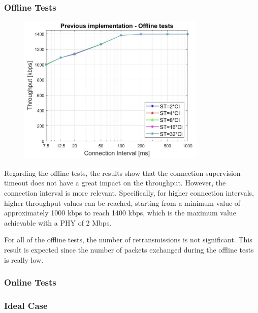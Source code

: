 \documentclass{Configuration_Files/PoliMi3i_thesis}
\begin{document}
\subsubsection*{Offline Tests}

\begin{figure}[h!]
    \centering
    \includegraphics[width=0.8\textwidth]{Results Manuel/figure1}
    \label{fig:figure1}
\end{figure}

Regarding the offline tests, the results show that the connection supervision timeout does not have a great impact on the throughput. However, the connection interval is more relevant. Specifically, for higher connection intervals, higher throughput values can be reached, starting from a minimum value of approximately 1000 kbps to reach 1400 kbps, which is the maximum value achievable with a PHY of 2 Mbps.

For all of the offline tests, the number of retransmissions is not significant. This result is expected since the number of packets exchanged during the offline tests is really low.

\subsubsection*{Online Tests}

\subsubsection*{Ideal Case}
\end{document}
